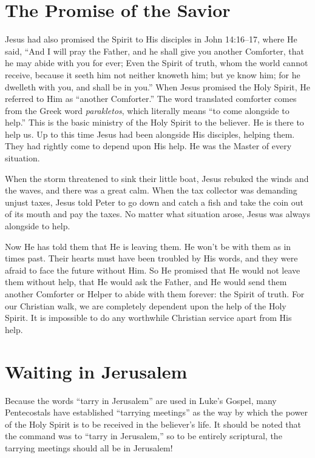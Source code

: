 \section*{The Promise of the Savior}

Jesus had also promised the Spirit to His disciples in
John 14:16–17, where He said, “And I will pray the Father,
and he shall give you another Comforter, that he may abide
with you for ever; Even the Spirit of truth, whom the world
cannot receive, because it seeth him not neither knoweth
him; but ye know him; for he dwelleth with you, and
shall be in you.” When Jesus promised the Holy Spirit, He
referred to Him as “another Comforter.” The word translated
comforter comes from the Greek word \emph{parakletos}, which
literally means “to come alongside to help.” This is the basic
ministry of the Holy Spirit to the believer. He is there to help
us. Up to this time Jesus had been alongside His disciples,
helping them. They had rightly come to depend upon His
help. He was the Master of every situation.

When the storm threatened to sink their little boat, Jesus
rebuked the winds and the waves, and there was a great
calm. When the tax collector was demanding unjust taxes,
Jesus told Peter to go down and catch a fish and take the
coin out of its mouth and pay the taxes. No matter what
situation arose, Jesus was always alongside to help.

Now He has told them that He is leaving them. He
won’t be with them as in times past. Their hearts must have
been troubled by His words, and they were afraid to face
the future without Him. So He promised that He would
not leave them without help, that He would ask the Father,
and He would send them another Comforter or Helper to
abide with them forever: the Spirit of truth. For our Christian
walk, we are completely dependent upon the help of
the Holy Spirit. It is impossible to do any worthwhile Christian
service apart from His help.


\section*{Waiting in Jerusalem}

Because the words “tarry in Jerusalem” are used in
Luke’s Gospel, many Pentecostals have established “tarrying
meetings” as the way by which the power of the Holy
Spirit is to be received in the believer’s life. It should be
noted that the command was to “tarry in Jerusalem,” so to
be entirely scriptural, the tarrying meetings should all be in
Jerusalem!

